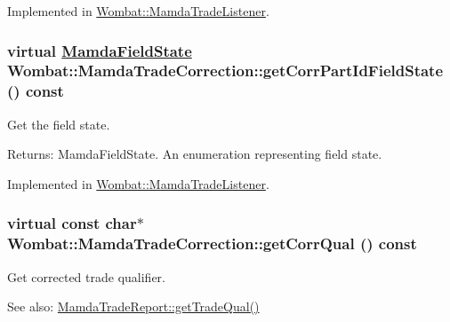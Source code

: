 Implemented in \hyperlink{classWombat_1_1MamdaTradeListener_efa0c3d21cf4d4bb0443c66c20dffc33}{Wombat::Mamda\-Trade\-Listener}.\hypertarget{classWombat_1_1MamdaTradeCorrection_8df9e9f374ef26377add4eec1da4bd43}{
\subsubsection[getCorrPartIdFieldState]{\setlength{\rightskip}{0pt plus 5cm}virtual \hyperlink{namespaceWombat_93aac974f2ab713554fd12a1fa3b7d2a}{Mamda\-Field\-State} Wombat::Mamda\-Trade\-Correction::get\-Corr\-Part\-Id\-Field\-State () const}}
\label{classWombat_1_1MamdaTradeCorrection_8df9e9f374ef26377add4eec1da4bd43}


Get the field state. 

\begin{Desc}
\item[Returns:]Mamda\-Field\-State. An enumeration representing field state. \end{Desc}


Implemented in \hyperlink{classWombat_1_1MamdaTradeListener_f6fa0ee1c2489746e1ee0bd5a6560d07}{Wombat::Mamda\-Trade\-Listener}.\hypertarget{classWombat_1_1MamdaTradeCorrection_f196c22d5419d952815af377bbd9639c}{
\subsubsection[getCorrQual]{\setlength{\rightskip}{0pt plus 5cm}virtual const char$\ast$ Wombat::Mamda\-Trade\-Correction::get\-Corr\-Qual () const}}
\label{classWombat_1_1MamdaTradeCorrection_f196c22d5419d952815af377bbd9639c}


Get corrected trade qualifier. 

\begin{Desc}
\item[See also:]\hyperlink{classWombat_1_1MamdaTradeReport_01f6e34bc27e4c6a9d2262327c2961d7}{Mamda\-Trade\-Report::get\-Trade\-Qual()} \end{Desc}


